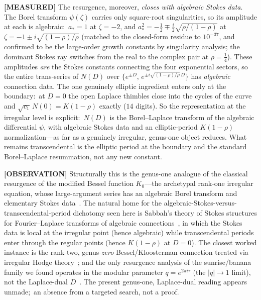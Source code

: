 \documentclass[aps,pra,twocolumn,superscriptaddress,longbibliography]{revtex4-2}
\begin{document}
\textbf{[MEASURED]} The resurgence, moreover, \emph{closes with algebraic Stokes
data}.  The Borel transform $\psi(\zeta)$ carries only square-root singularities,
so its amplitude at each is algebraic:\ $a_{*}=1$ at $\zeta=-2$, and
$a_{*}^{2}=-\tfrac12\mp\tfrac{i}{2}\sqrt{\rho/(1-\rho)}$ at
$\zeta=-1\pm i\sqrt{(1-\rho)/\rho}$ (matched to the closed-form residue to
$10^{-37}$, and confirmed to be the large-order growth constants by singularity
analysis; the dominant Stokes ray switches from the real to the complex pair at
$\rho=\tfrac14$).  These amplitudes \emph{are} the Stokes constants connecting the
four exponential sectors, so the entire trans-series of $N(D)$ over
$\{e^{\pm D},\,e^{\pm i\sqrt{(1-\rho)/\rho}\,D}\}$ has \emph{algebraic} connection
data.  The one genuinely elliptic ingredient enters only at the boundary:\ at $D=0$
the open Laplace thimbles close into the cycles of the curve and
$\sqrt{c_{1}}\,N(0)=K(1-\rho)$ exactly ($14$ digits).  So the representation at the
irregular level is explicit:\ $N(D)$ is the Borel--Laplace transform of the algebraic
differential $\psi$, with algebraic Stokes data and an elliptic-period
$K(1-\rho)$ normalization---as far as a genuinely irregular, genus-one object
reduces.  What remains transcendental is the elliptic period at the boundary and the
standard Borel--Laplace resummation, not any new constant.

\textbf{[OBSERVATION]} Structurally this is the genus-one analogue of the classical
resurgence of the modified Bessel function $K_{0}$---the archetypal rank-one
irregular equation, whose large-argument series has an algebraic Borel transform and
elementary Stokes data~\cite{dingle1973,costin2008}.  The natural home for the
algebraic-Stokes-versus-transcendental-period dichotomy seen here is Sabbah's theory
of Stokes structures for Fourier--Laplace transforms of algebraic
connections~\cite{sabbah_stokes2013}, in which the Stokes data is local at the
irregular point (hence algebraic) while transcendental periods enter through the
regular points (hence $K(1-\rho)$ at $D=0$).  The closest worked instance is the
rank-two, genus-\emph{zero} Bessel/Kloosterman connection treated via irregular Hodge
theory~\cite{fresansabbahyu2023}; and the only resurgence analysis of the
sunrise/banana family we found operates in the modular parameter $q=e^{2\pi i\tau}$
(the $|q|\to1$ limit), not the Laplace-dual $D$~\cite{broadhurst_dorigoni2026}.  The
present genus-one, Laplace-dual reading appears unmade;\ an absence from a targeted
search, not a proof.
\end{document}
